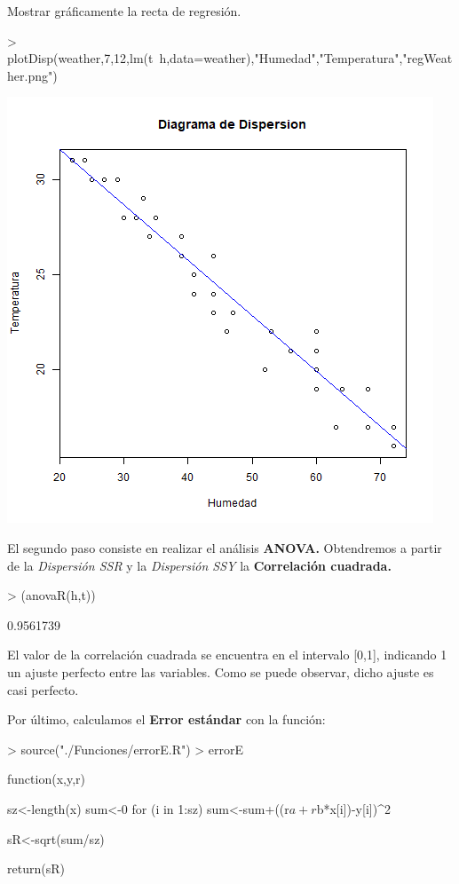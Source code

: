 \documentclass [a4paper] {article}
\begin{document}
\bigskip
Mostrar gráficamente la recta de regresión.
\begin{Schunk}
\begin{Sinput}
> plotDisp(weather,7,12,lm(t~h,data=weather),"Humedad","Temperatura","regWeather.png")
\end{Sinput}
\end{Schunk}
\includegraphics[width=\textwidth]{regWeather}

\bigskip
El segundo paso consiste en realizar el análisis \textbf{ANOVA.} Obtendremos a partir de la \textit{Dispersión SSR} y la
\textit{Dispersión SSY} la \textbf{Correlación cuadrada.}
\begin{Schunk}
\begin{Sinput}
> (anovaR(h,t))
\end{Sinput}
\begin{Soutput}
[1] 0.9561739
\end{Soutput}
\end{Schunk}

\bigskip
El valor de la correlación cuadrada se encuentra en el intervalo [0,1], indicando 1 un ajuste perfecto entre las variables. Como se 
puede observar, dicho ajuste es casi perfecto.

\bigskip
Por último, calculamos el \textbf{Error estándar} con la función:
\begin{Schunk}
\begin{Sinput}
> source("./Funciones/errorE.R")
> errorE
\end{Sinput}
\begin{Soutput}
function(x,y,r) {
    sz<-length(x)
    sum<-0
    for (i in 1:sz){
        sum<-sum+((r$a+r$b*x[i])-y[i])^2
    }

    sR<-sqrt(sum/sz)

    return(sR)
}
\end{Soutput}
\end{Schunk}
\end{document}
